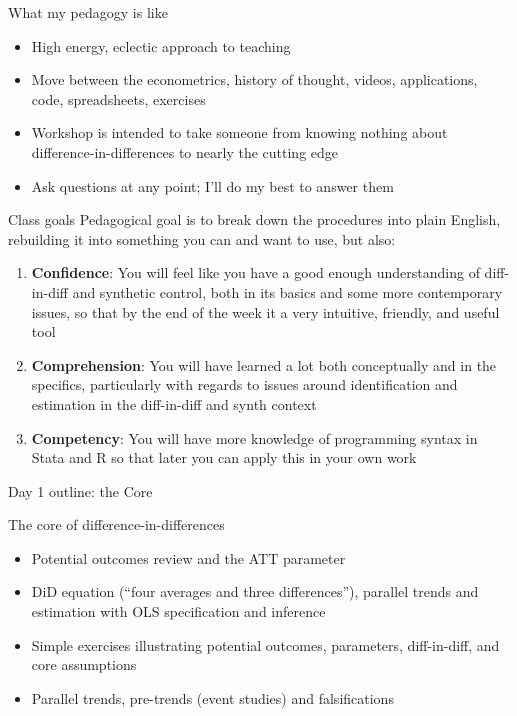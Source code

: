 \documentclass{beamer}
\begin{document}
\begin{frame}{What my pedagogy is like}

\begin{itemize}
\item High energy, eclectic approach to teaching
\item Move between the econometrics, history of thought, videos, applications, code, spreadsheets, exercises
\item Workshop is intended to take someone from knowing nothing about difference-in-differences to nearly the cutting edge
\item Ask questions at any point; I'll do my best to answer them
\end{itemize}

\end{frame}


\begin{frame}{Class goals}
Pedagogical goal is to break down the procedures into plain English, rebuilding it into something you can and want to use, but also:

  \begin{enumerate}
    \item \textbf{Confidence}: You will feel like you have a good enough understanding of diff-in-diff and synthetic control, both in its basics and some more contemporary issues, so that by the end of the week it a very intuitive, friendly, and useful tool
    \item \textbf{Comprehension}: You will have learned a lot both conceptually and in the specifics, particularly with regards to issues around identification and estimation in the diff-in-diff and synth context
    \item \textbf{Competency}: You will have more knowledge of programming syntax in Stata and R so that later you can apply this in your own work
  \end{enumerate}

\end{frame}



\begin{frame}{Day 1 outline: the Core}

The core of difference-in-differences 
	\begin{itemize}
	\item Potential outcomes review and the ATT parameter
	\item DiD equation (``four averages and three differences''), parallel trends and estimation with OLS specification and inference
	\item Simple exercises illustrating potential outcomes, parameters, diff-in-diff, and core assumptions  
	\item Parallel trends, pre-trends (event studies) and falsifications
	\end{itemize}

\end{frame}
\end{document}
